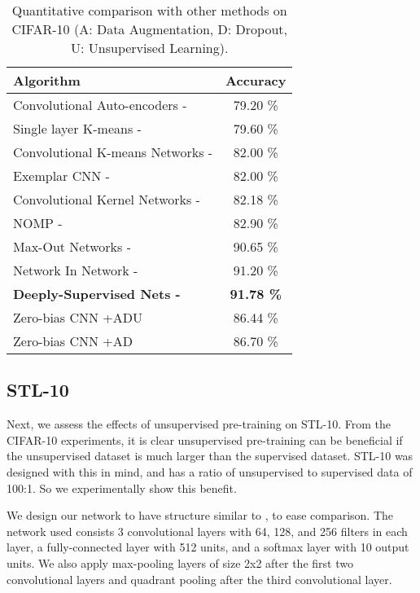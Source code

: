 \documentclass{article} \usepackage{iclr2015,times}
\begin{document}
\begin{table}[b]
\begin{center}
    \caption{Quantitative comparison with other methods on CIFAR-10 (A: Data Augmentation, D: Dropout, U: Unsupervised Learning).}
    \label{tab:method_comp_cifar}
    \begin{tabular}{ |l | c |}
    \hline
    Algorithm & Accuracy \\ \hline    
    Convolutional Auto-encoders - \citet{masci2011stacked} & 79.20 \% \\ Single layer K-means - \citet{coates2011analysis} & 79.60 \% \\ Convolutional K-means Networks - \citet{coates2011selecting} & 82.00 \% \\ Exemplar CNN - \citet{dosovitskiy2014discriminative} & 82.00 \% \\ Convolutional Kernel Networks - \citet{Mairal2014convolutional} & 82.18 \% \\ NOMP - \citet{lin2014stable} & 82.90 \% \\ Max-Out Networks - \citet{goodfellow2013maxout} & 90.65 \% \\
    Network In Network - \citet{lin2013network} & 91.20 \% \\ 
    \textbf{Deeply-Supervised Nets - \citet{lee2014deeply}} & \textbf{91.78 \%} \\
    \hline
    \hline
    Zero-bias CNN +ADU &  86.44 \% \\ \hline
    Zero-bias CNN +AD &  86.70 \% \\ 
    \hline
    \end{tabular}
\end{center}
\end{table}


\subsection{STL-10}

Next, we assess the effects of unsupervised pre-training on STL-10. From the CIFAR-10 experiments, it is clear unsupervised pre-training can be beneficial if the unsupervised dataset is much larger than the supervised dataset. STL-10 was designed with this in mind, and has a ratio of unsupervised to supervised data of 100:1. So we experimentally show this benefit. 

We design our network to have structure similar to \citet{dosovitskiy2014discriminative}, to ease comparison. The network used consists 3 convolutional layers with 64, 128, and 256 filters in each layer, a fully-connected layer with 512 units, and a softmax layer with 10 output units. We also apply max-pooling layers of size 2x2 after the first two convolutional layers and quadrant pooling after the third convolutional layer.
\end{document}
